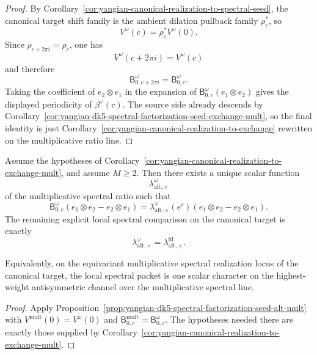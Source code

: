 \begin{proof}
By
Corollary~\ref{cor:yangian-canonical-realization-to-spectral-seed},
the canonical target shift family is the ambient dilation pullback
family \(\rho_c^*\), so
\[
V^\omega(c)=\rho_c^*V^\omega(0).
\]
Since \(\rho_{c+2\pi i}=\rho_c\), one has
\[
V^\omega(c+2\pi i)=V^\omega(c)
\]
and therefore
\[
\mathsf B_{0,c+2\pi i}^{\omega}
=
\mathsf B_{0,c}^{\omega}.
\]
Taking the coefficient of \(e_2\otimes e_1\) in the expansion of
\(\mathsf B_{0,c}^{\omega}(e_1\otimes e_2)\) gives the displayed
periodicity of \(\beta^\omega(c)\).  The source side already descends
by
Corollary~\ref{cor:yangian-dk5-spectral-factorization-seed-exchange-mult},
so the final identity is just
Corollary~\ref{cor:yangian-canonical-realization-to-exchange}
rewritten on the multiplicative ratio line.
\end{proof}

\begin{corollary}
\label{cor:yangian-canonical-realization-to-alt-mult}
Assume the hypotheses of
Corollary~\ref{cor:yangian-canonical-realization-to-exchange-mult}, and
assume \(M\ge 2\).  Then there exists a unique scalar function
\[
\lambda_{\mathrm{alt},\times}^{\omega}
\]
of the multiplicative spectral ratio such that
\[
\mathsf B_{0,c}^{\omega}
(e_1\otimes e_2-e_2\otimes e_1)
=
\lambda_{\mathrm{alt},\times}^{\omega}(e^c)
(e_1\otimes e_2-e_2\otimes e_1).
\]
The remaining explicit local spectral comparison on the canonical
target is exactly
\[
\lambda_{\mathrm{alt},\times}^{\omega}
=
\lambda_{\mathrm{alt},\times}^{\mathrm{fd}}.
\]

Equivalently, on the equivariant multiplicative spectral realization
locus of the canonical target, the local spectral packet is one scalar
character on the highest-weight antisymmetric channel over the
multiplicative spectral line.
\end{corollary}

\begin{proof}
Apply
Proposition~\ref{prop:yangian-dk5-spectral-factorization-seed-alt-mult}
with \(V^{\mathrm{mult}}(0)=V^\omega(0)\) and
\(\mathsf B_{0,c}^{\mathrm{mult}}=\mathsf B_{0,c}^{\omega}\).  The
hypotheses needed there are exactly those supplied by
Corollary~\ref{cor:yangian-canonical-realization-to-exchange-mult}.
\end{proof}


